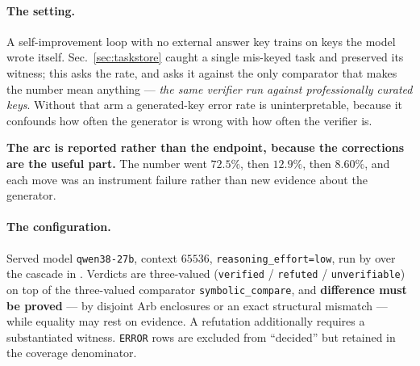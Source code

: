 \paragraph{The setting.} A self-improvement loop with no external answer key trains on keys the
model wrote itself. Sec.~\ref{sec:taskstore} caught a single mis-keyed task and preserved its
witness; this asks the rate, and asks it against the only comparator that makes the number
mean anything --- \emph{the same verifier run against professionally curated keys}. Without
that arm a generated-key error rate is uninterpretable, because it confounds how often the
generator is wrong with how often the verifier is.

\textbf{The arc is reported rather than the endpoint, because the corrections are the useful
part.} The number went $72.5\%$, then $12.9\%$, then $8.60\%$, and each move was an instrument
failure rather than new evidence about the generator.

\paragraph{The configuration.} Served model \texttt{qwen38-27b}, context $65536$,
\texttt{reasoning\_effort=low}, run by  over the cascade in
. Verdicts are three-valued
(\texttt{verified} / \texttt{refuted} / \texttt{unverifiable}) on top of the three-valued
comparator \texttt{symbolic\_compare}, and \textbf{difference must be proved} --- by disjoint
Arb enclosures or an exact structural mismatch --- while equality may rest on evidence. A
refutation additionally requires a substantiated witness. \texttt{ERROR} rows are excluded from
``decided'' but retained in the coverage denominator.


